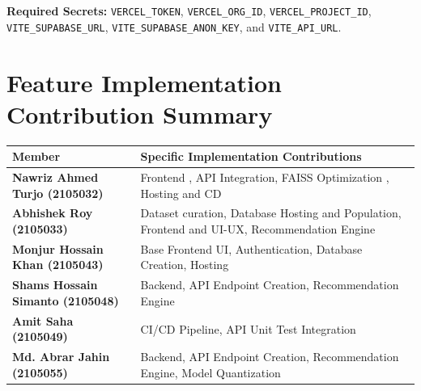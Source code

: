 \documentclass[11pt, a4paper]{report}
\begin{document}
\textbf{Required Secrets:} \texttt{VERCEL\_TOKEN}, \texttt{VERCEL\_ORG\_ID}, \texttt{VERCEL\_PROJECT\_ID}, \texttt{VITE\_SUPABASE\_URL}, \texttt{VITE\_SUPABASE\_ANON\_KEY}, and \texttt{VITE\_API\_URL}.

\pagebreak

\section{Feature Implementation Contribution Summary}
\begin{table}[h]
    \centering
    \renewcommand{\arraystretch}{1.3}
    \begin{tabularx}{\textwidth}{l X}
        \toprule
        \textbf{Member} & \textbf{Specific Implementation Contributions} \\
        \midrule
        \textbf{Nawriz Ahmed Turjo (2105032)} & Frontend , API Integration, FAISS Optimization , Hosting and CD \\
        \textbf{Abhishek Roy (2105033)} & Dataset curation, Database Hosting and Population, Frontend and UI-UX, Recommendation Engine \\
        \textbf{Monjur Hossain Khan (2105043)} & Base Frontend UI, Authentication, Database Creation, Hosting \\
        \textbf{Shams Hossain Simanto (2105048)} & Backend, API Endpoint Creation, Recommendation Engine \\
        \textbf{Amit Saha (2105049)} & CI/CD Pipeline, API Unit Test Integration \\
        \textbf{Md. Abrar Jahin (2105055)} & Backend, API Endpoint Creation, Recommendation Engine, Model Quantization \\
        \bottomrule
    \end{tabularx}
\end{table}
\end{document}
